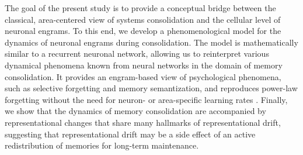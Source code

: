 The goal of the present study is to provide a conceptual bridge between the classical, area-centered view of systems consolidation and the cellular level of neuronal engrams. To this end, we develop a phenomenological model for the dynamics of neuronal engrams during consolidation. The model is mathematically similar to a recurrent neuronal network, allowing us to reinterpret various dynamical phenomena known from neural networks in the domain of memory consolidation. It provides an engram-based view of psychological phenomena, such as selective forgetting and memory semantization, and reproduces power-law forgetting without the need for neuron- or area-specific learning rates \citep{Roxin2013}. Finally, we show that the dynamics of memory consolidation are accompanied by representational changes that share many hallmarks of representational drift, suggesting that representational drift may be a side effect of an active redistribution of memories for long-term maintenance.
